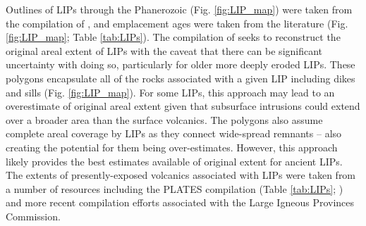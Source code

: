 \documentclass[11pt,letterpaper]{article}
\begin{document}
Outlines of LIPs through the Phanerozoic (Fig. \ref{fig:LIP_map}) were taken from the compilation of \citet{Ernst2017a}, and emplacement ages were taken from the literature (Fig. \ref{fig:LIP_map}; Table \ref{tab:LIPs}). The compilation of \citet{Ernst2017a} seeks to reconstruct the original areal extent of LIPs with the caveat that there can be significant uncertainty with doing so, particularly for older more deeply eroded LIPs. These polygons encapsulate all of the rocks associated with a given LIP including dikes and sills (Fig. \ref{fig:LIP_map}). For some LIPs, this approach may lead to an overestimate of original areal extent given that subsurface intrusions could extend over a broader area than the surface volcanics. The polygons also assume complete areal coverage by LIPs as they connect wide-spread remnants -- also creating the potential for them being over-estimates. However, this approach likely provides the best estimates available of original extent for ancient LIPs.  The extents of presently-exposed volcanics associated with LIPs were taken from a number of resources including the PLATES compilation (Table \ref{tab:LIPs}; \citealp{Coffin2006a}) and more recent compilation efforts associated with the Large Igneous Provinces Commission. 
\end{document}
